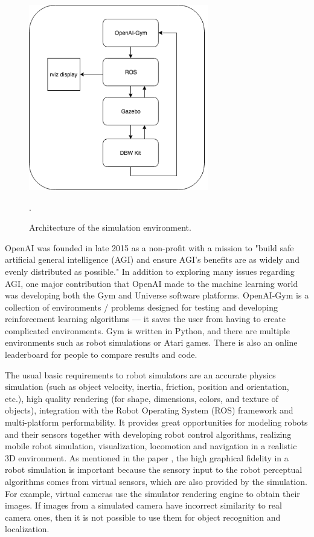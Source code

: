 \begin{figure}[h]
\centering
\includegraphics[width=0.7\textwidth]{figs/ch2/simulation-architecture}
\caption{Architecture of the simulation environment.}
\label{fig:sim-env}.
\end{figure}


OpenAI was founded in late 2015 as a non-profit with a mission to "build safe artificial general intelligence (AGI) and ensure AGI's benefits are as widely and evenly distributed as possible." In addition to exploring many issues regarding AGI, one major contribution that OpenAI made to the machine learning world was developing both the Gym and Universe software platforms. OpenAI-Gym is a collection of environments / problems designed for testing and developing reinforcement learning algorithms --- it saves the user from having to create complicated environments. Gym is written in Python, and there are multiple environments such as robot simulations or Atari games. There is also an online leaderboard for people to compare results and code.



The usual basic requirements to robot simulators are an accurate physics simulation (such as object velocity, inertia, friction, position and orientation, etc.), high quality rendering (for shape, dimensions, colors, and texture of objects), integration with the Robot Operating System (ROS) framework and multi-platform performability. It provides great opportunities for modeling robots and their sensors together with developing robot control algorithms, realizing mobile robot simulation, visualization, locomotion and navigation in a realistic 3D environment. As mentioned in the paper \cite{jmeSim2012}, the high graphical fidelity in a robot simulation is important because the sensory input to the robot perceptual algorithms comes from virtual sensors, which are also provided by the simulation. For example, virtual cameras use the simulator rendering engine to obtain their images. If images from a simulated camera have incorrect similarity to real camera ones, then it is not possible to use them for object recognition and localization.

